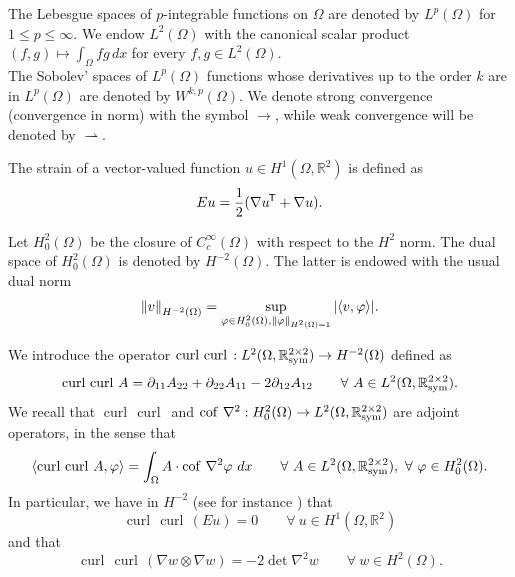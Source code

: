 \documentclass[a4, 11pt, reqno, final]{amsart}
\newcommand{\bbR}{\mathbb{R}}
\newcommand{\n}[1]{\left\|#1\right\|}  %
\newcommand\weak{\rightharpoonup} %
\theoremstyle{plain}%
\DeclareMathOperator{\cof}{cof\,}
\DeclareMathOperator{\curl}{curl\,}
\DeclareMathOperator{\Sym}{\bbR^{2\times 2}_{\rm sym}}
\newcommand*{\tran}{^{\mkern-1.5mu\mathsf{T}}}
\begin{document}
	The Lebesgue spaces of $p$-integrable functions on $\Omega$ are denoted by $L^p(\Omega)$ for $1\leq p\leq \infty$.
	We endow $L^2(\Omega)$ with the canonical scalar product $(f,g) \mapsto \int_\Omega fg \, dx$ for every $f,g \in L^2(\Omega)$.\\
	The Sobolev' spaces of $L^p(\Omega)$ functions whose derivatives up to the order $k$ are in $L^p(\Omega)$ are denoted by $W^{k,p}(\Omega)$.
	We denote strong convergence (convergence in norm) with the symbol $\to$, while weak convergence will be denoted by $\weak$.

	The strain of a vector-valued function $u \in H^1(\Omega, \bbR^2)$ is defined as $$Eu = \frac12(\nabla u\tran + \nabla u).$$

	Let $H^2_0(\Omega)$ be the closure of $C_c^\infty(\Omega)$ with respect to the $H^2$ norm.
	The dual space of $H_0^2(\Omega)$ is denoted by $H^{-2}(\Omega)$.
	The latter is endowed with the usual dual norm
	$$ \n{v}_{H^{-2}(\Omega)} = \sup\limits_{\varphi\in H^2_0(\Omega),\\ \n{\varphi}_{H^2(\Omega)=1}} |\langle v, \varphi \rangle|.$$

	We introduce the operator $\curl\curl: L^2(\Omega, \Sym) \to H^{-2}(\Omega)$ defined as $$\curl\curl A = \partial_{11}A_{22} + \partial_{22}A_{11} - 2\partial_{12}A_{12} \qquad \forall \  A \in L^2(\Omega, \Sym).$$
	We recall that $\curl\curl$  and $\cof\nabla^2: H_0^2(\Omega) \to L^2(\Omega,\Sym)$ are adjoint operators, in the sense that 	\begin{equation}\label{ccA}\langle \curl\curl A, \varphi\rangle = \int_\Omega A\cdot \cof\nabla^2 \varphi \ dx \qquad \forall \ A \in L^2(\Omega, \Sym), \ \forall \ \varphi \in H_0^2(\Omega).\end{equation}
	In particular,  we have in $H^{-2}$ (see for instance \cite{DOnofrio2005}) that
	\begin{equation}\label{cceu}
		\curl\curl(E u) = 0 \qquad \forall \ u \in H^1(\Omega, \bbR^2)
	\end{equation}
	and 	that
	\begin{equation}\label{ccww}\curl\curl(\nabla w \otimes \nabla w) = -2\det\nabla^2 w \qquad \forall \ w \in H^2(\Omega).
	\end{equation}
\end{document}
